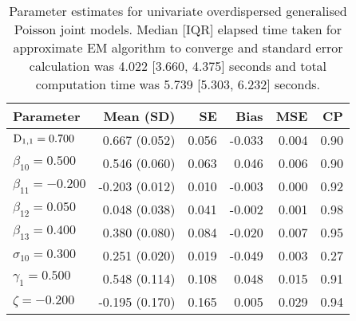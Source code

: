 \begin{table}[ht]
\centering
{}
\captionsetup{font=scriptsize}
\begingroup\scriptsize
\begin{tabular}{l|rrrrr}
  Parameter & Mean (SD) & SE & Bias & MSE & CP \\ 
  \hline
  $\mathrm{D}_{1,1} = 0.700$ &  0.667 (0.052) & 0.056 & -0.033 & 0.004 & 0.90 \\ 
  $\beta_{10} = 0.500$ &  0.546 (0.060) & 0.063 &  0.046 & 0.006 & 0.90 \\ 
  $\beta_{11} = -0.200$ & -0.203 (0.012) & 0.010 & -0.003 & 0.000 & 0.92 \\ 
  $\beta_{12} = 0.050$ &  0.048 (0.038) & 0.041 & -0.002 & 0.001 & 0.98 \\ 
  $\beta_{13} = 0.400$ &  0.380 (0.080) & 0.084 & -0.020 & 0.007 & 0.95 \\ 
  $\sigma_{10} = 0.300$ &  0.251 (0.020) & 0.019 & -0.049 & 0.003 & 0.27 \\ 
  $\gamma_1 = 0.500$ &  0.548 (0.114) & 0.108 &  0.048 & 0.015 & 0.91 \\ 
  $\zeta = -0.200$ & -0.195 (0.170) & 0.165 &  0.005 & 0.029 & 0.94 \\ 
   \hline
\end{tabular}
\endgroup
\caption{Parameter estimates for univariate overdispersed generalised Poisson joint models. Median [IQR] elapsed time taken for approximate EM algorithm to converge and standard error calculation was 4.022 [3.660, 4.375] seconds and total computation time was 5.739 [5.303, 6.232] seconds.} 
\end{table}


